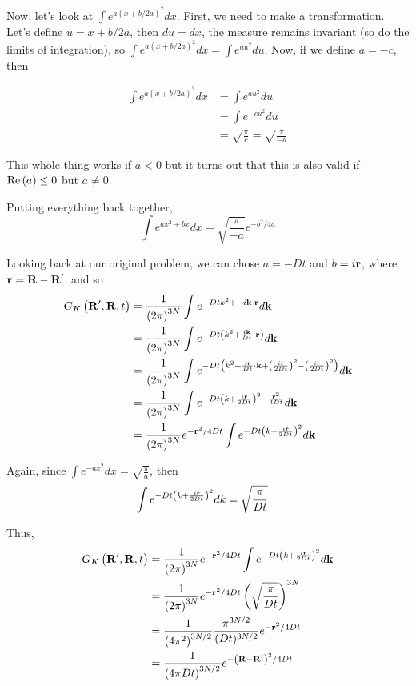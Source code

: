 Now, let's look at $\int e^{ a\left(x + b/2a\right)^2 } dx$.
First, we need to make a transformation.
Let's define $u = x + b/2a$, then $du = dx$, the measure remains invariant (so do the limits of integration), so
$\int e^{ a\left(x + b/2a\right)^2 } dx = \int e^{ au^2 } du$.
Now, if we define $a = -c$, then 

\begin{align*}
\int e^{ a\left(x + b/2a\right)^2 } dx &= \int e^{ au^2 } du \\
&= \int e^{ -cu^2 } du \\
&= \sqrt{ \frac{\pi}{c} } = \sqrt{ \frac{\pi}{-a} } 
\end{align*}

This whole thing works if $a < 0$ but it turns out that this is also valid if $\operatorname{Re}{(a)} \leq 0$ but $a \neq 0$.

Putting everything back together,
$$
\int e^{ax^2 + bx} dx = \sqrt{ \frac{\pi}{-a} } e^{-b^2/4a}
$$

Looking back at our original problem, we can chose $a = -Dt$ and $b = i \boldsymbol{\mathbf{r}}$, where $\boldsymbol{\mathbf{r}} = \boldsymbol{\mathbf{R}}-\boldsymbol{\mathbf{R}}^\prime$.
and so
\begin{align*}
G_K \left(\boldsymbol{\mathbf{R}}^\prime, \boldsymbol{\mathbf{R}}, t\right) &=
\frac{1}{\left(2\pi\right)^{3N}} \int e^{-Dtk^2 + -i\boldsymbol{\mathbf{k}}\cdot\boldsymbol{\mathbf{r}}} d\mathbf{k} \\
&= \frac{1}{\left(2\pi\right)^{3N}} \int e^{-Dt \left( k^2 + \frac{i\boldsymbol{\mathbf{k}}}{Dt}\cdot\boldsymbol{\mathbf{r}} \right)} d\mathbf{k} \\
&= \frac{1}{\left(2\pi\right)^{3N}} \int e^{-Dt \left( k^2 + \frac{i\boldsymbol{\mathbf{r}}}{Dt}\cdot\boldsymbol{\mathbf{k}} + \left(\frac{i\boldsymbol{\mathbf{r}}}{2Dt}\right)^2 - \left(\frac{i\boldsymbol{\mathbf{r}}}{2Dt}\right)^2 \right)} d\mathbf{k} \\
&= \frac{1}{\left(2\pi\right)^{3N}} \int e^{-Dt \left( k + \frac{i\boldsymbol{\mathbf{r}}}{2Dt}\right)^2 - \frac{ \boldsymbol{\mathbf{r}}^2 }{ 4Dt } } d\mathbf{k} \\
&= \frac{1}{\left(2\pi\right)^{3N}} e^{-\boldsymbol{\mathbf{r}}^2 /4Dt } \int e^{-Dt \left( k + \frac{i\boldsymbol{\mathbf{r}}}{2Dt}\right)^2 } d\mathbf{k} \\
\end{align*}

Again, since $\int e^{-ax^2} dx = \sqrt{ \frac{\pi}{a} }$,
then
\begin{align*}
\int e^{-Dt \left( k + \frac{i\boldsymbol{\mathbf{r}}}{2Dt}\right)^2 } dk &= \sqrt{ \frac{\pi}{Dt} }
\end{align*}

Thus,
\begin{align*}
G_K \left(\boldsymbol{\mathbf{R}}^\prime, \boldsymbol{\mathbf{R}}, t\right) &=
\frac{1}{\left(2\pi\right)^{3N}} e^{-\boldsymbol{\mathbf{r}}^2 /4Dt } \int e^{-Dt \left( k + \frac{i\boldsymbol{\mathbf{r}}}{2Dt}\right)^2 } d\mathbf{k} \\
&= \frac{1}{\left(2\pi\right)^{3N}} e^{-\boldsymbol{\mathbf{r}}^2 /4Dt } \left( \sqrt{ \frac{\pi}{Dt} } \right)^{3N} \\
&= \frac{1}{\left(4\pi^2\right)^{3N/2}} \frac{\pi^{3N/2}}{(Dt)^{3N/2}} e^{-\boldsymbol{\mathbf{r}}^2 /4Dt } \\
&= \frac{1}{\left(4\pi Dt\right)^{3N/2}} e^{-\left(\boldsymbol{\mathbf{R}} - \boldsymbol{\mathbf{R}}^\prime\right)^2 /4Dt }
\end{align*}



